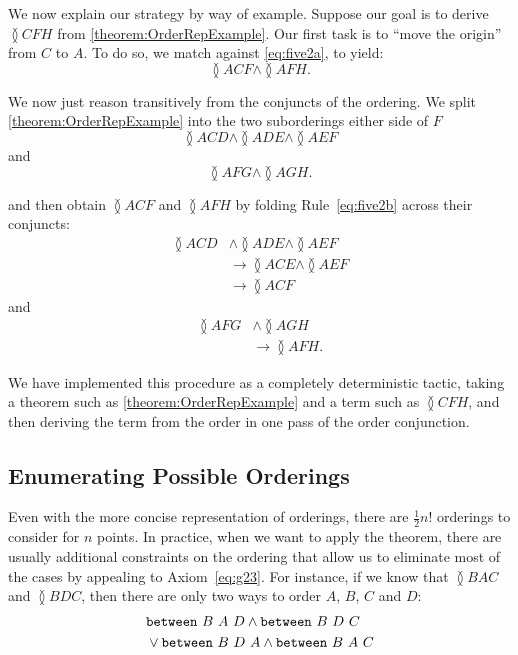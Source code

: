 We now explain our strategy by way of example. Suppose our goal is to derive $\between{C}{F}{H}$ from \eqref{theorem:OrderRepExample}. Our first task is to ``move the origin'' from $C$ to $A$. To do so, we match against \eqref{eq:five2a}, to yield:
\begin{displaymath}
\between{A}{C}{F} \wedge \between{A}{F}{H}.
\end{displaymath}

We now just reason transitively from the conjuncts of the ordering. We split \eqref{theorem:OrderRepExample} into the two suborderings either side of $F$
\begin{displaymath}
\between{A}{C}{D} \wedge \between{A}{D}{E} \wedge\between{A}{E}{F}
\end{displaymath}
and
\begin{displaymath}
\between{A}{F}{G}\wedge\between{A}{G}{H}.
\end{displaymath}

and then obtain $\between{A}{C}{F}$ and $\between{A}{F}{H}$ by folding Rule~\eqref{eq:five2b} across their conjuncts:
\begin{align*}
\between{A}{C}{D} &\wedge \between{A}{D}{E} \wedge\between{A}{E}{F}\\
&\longrightarrow \between{A}{C}{E} \wedge \between{A}{E}{F}\\
&\longrightarrow \between{A}{C}{F}
\end{align*}
and
\begin{align*}
\between{A}{F}{G} &\wedge \between{A}{G}{H}\\
&\longrightarrow \between{A}{F}{H}.
\end{align*}

We have implemented this procedure as a completely deterministic tactic, taking a theorem such as \eqref{theorem:OrderRepExample} and a term such as $\between{C}{F}{H}$, and then deriving the term from the order in one pass of the order conjunction.

\subsection{Enumerating Possible Orderings}
Even with the more concise representation of orderings, there are $\frac{1}{2}n!$ orderings to consider for $n$ points. In practice, when we want to apply the theorem, there are usually additional constraints on the ordering that allow us to eliminate most of the cases by appealing to Axiom~\ref{eq:g23}. For instance, if we know that $\between{B}{A}{C}$ and $\between{B}{D}{C}$, then there are only two ways to order $A$, $B$, $C$ and $D$:
\begin{align*}
&\texttt{between}\ B\ A\ D\wedge\texttt{between}\ B\ D\ C\\
&\vee\texttt{between}\ B\ D\ A\wedge\texttt{between}\ B\ A\ C
\end{align*}

